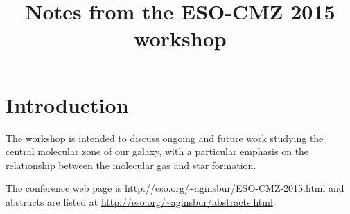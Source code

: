 \title{Notes from the ESO-CMZ 2015 workshop}
\section{Introduction}
The workshop is intended to discuss ongoing and future work studying the central molecular zone of our galaxy, with a particular emphasis on the relationship between the molecular gas and star formation.

The conference web page is \url{http://eso.org/~aginsbur/ESO-CMZ-2015.html} and abstracts are listed at \url{http://eso.org/~aginsbur/abstracts.html}.  